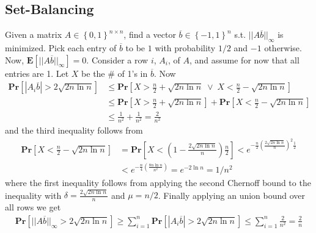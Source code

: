 \documentclass[12pt]{article}
\begin{document}
\subsection*{Set-Balancing}
Given a matrix $A \in \left\{ 0,1 \right\}^{n \times n}$, find a vector $\overline{b} \in \left\{ -1, 1 \right\}^n$ s.t. $|| A\overline{b} ||_{\infty}$ is minimized. Pick each entry of $\overline{b}$ to be $1$ with probability $1/2$ and $-1$ otherwise. Now, $\mathbf{E} \left[ || A\overline{b} ||_{\infty} \right] = 0$. Consider a row $i$, $A_{i}$, of $A$, and assume for now that all entries are 1. Let $X$ be the \# of 1's in $\overline{b}$. Now
\begin{align*}
\mathbf{Pr} \left[ | A_i\overline{b} | > 2\sqrt{2n \ln n} \right] &\leq \mathbf{Pr} \left[ X > \frac{n}{2} + \sqrt{2n \ln n} \; \lor \; X < \frac{n}{2} - \sqrt{2n \ln n} \right] \\
&\leq \mathbf{Pr} \left[ X > \frac{n}{2} + \sqrt{2n \ln n} \right] + \mathbf{Pr} \left[ X < \frac{n}{2} - \sqrt{2n \ln n} \right] \\
&\leq \frac{1}{n^2} + \frac{1}{n^2} = \frac{2}{n^2}
\end{align*}
and the third inequality follows from
\begin{align*}
\mathbf{Pr} \left[ X < \frac{n}{2} - \sqrt{2n \ln n} \right]
&= \mathbf{Pr} \left[ X < \left( 1 - \frac{2\sqrt{2n \ln n}}{n} \right)\frac{n}{2} \right]
< e^{-\frac{n}{2} \left( \frac{2\sqrt{2n \ln n}}{n}\right)^2\frac{1}{2}} \\
&< e^{-\frac{n}{4} \left( \frac{8n \ln n}{n^2}\right)} = e^{-2\ln n} = 1/n^2
\end{align*}
where the first inequality follows from applying the second Chernoff bound to the inequality with $\delta=\frac{2\sqrt{2n \ln n}}{n}$ and $\mu=n/2$. Finally applying an union bound over all rows we get
\begin{align*}
\mathbf{Pr} \left[ || A\overline{b} ||_{\infty} > 2\sqrt{2n \ln n} \right] \geq \sum_{i=1}^n \mathbf{Pr} \left[ | A_i\overline{b} | > 2\sqrt{2n \ln n} \right] \leq \sum_{i=1}^n \frac{2}{n^2} = \frac{2}{n}
\end{align*}
\end{document}
